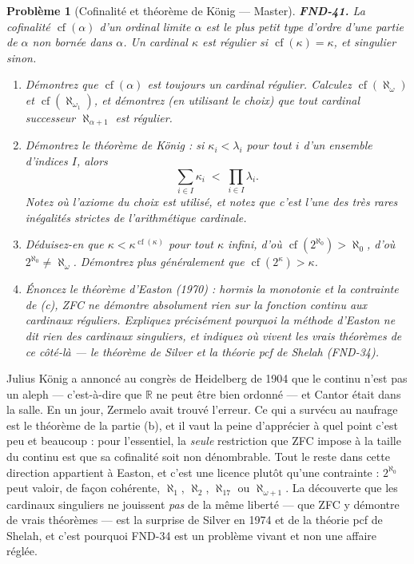 \documentclass[11pt]{article}
\newtheorem{problem}{Problème}
\begin{document}
\begin{problem}[{Cofinalité et théorème de König --- Master}]
\textbf{FND-41.} La \textit{cofinalité} $ \operatorname{cf}(\alpha) $ d'un ordinal limite
$ \alpha $ est le plus petit type d'ordre d'une partie de $ \alpha $ non bornée dans
$ \alpha $. Un cardinal $ \kappa $ est \textit{régulier} si
$ \operatorname{cf}(\kappa) = \kappa $, et \textit{singulier} sinon.
\begin{enumerate}
\item[(a)] Démontrez que $ \operatorname{cf}(\alpha) $ est toujours un cardinal régulier. Calculez
$ \operatorname{cf}(\aleph_\omega) $ et $ \operatorname{cf}(\aleph_{\omega_1}) $, et
démontrez (en utilisant le choix) que tout cardinal successeur $ \aleph_{\alpha+1} $ est
régulier.
\item[(b)] Démontrez le théorème de König : si $ \kappa_i < \lambda_i $ pour tout $ i $ d'un
ensemble d'indices $ I $, alors
\[ \sum_{i \in I} \kappa_i \;<\; \prod_{i \in I} \lambda_i . \]
Notez où l'axiome du choix est utilisé, et notez que c'est l'une des très rares inégalités
strictes de l'arithmétique cardinale.
\item[(c)] Déduisez-en que $ \kappa < \kappa^{\operatorname{cf}(\kappa)} $ pour tout $ \kappa $
infini, d'où $ \operatorname{cf}(2^{\aleph_0}) > \aleph_0 $, d'où
$ 2^{\aleph_0} \ne \aleph_\omega $. Démontrez plus généralement que
$ \operatorname{cf}(2^{\kappa}) > \kappa $.
\item[(d)] Énoncez le théorème d'Easton (1970) : hormis la monotonie et la contrainte de (c), ZFC ne
démontre absolument rien sur la fonction continu aux cardinaux \textit{réguliers}. Expliquez
précisément pourquoi la méthode d'Easton ne dit rien des cardinaux singuliers, et indiquez où
vivent les vrais théorèmes de ce côté-là --- le théorème de Silver et la théorie pcf de Shelah
(FND-34).
\end{enumerate}

\end{problem}

\noindent Julius König a annoncé au congrès de Heidelberg de 1904 que le continu n'est pas
un aleph --- c'est-à-dire que $\mathbb{R}$ ne peut être bien ordonné --- et Cantor était dans la salle. En un
jour, Zermelo avait trouvé l'erreur. Ce qui a survécu au naufrage est le théorème de la partie
(b), et il vaut la peine d'apprécier à quel point c'est peu et beaucoup : pour l'essentiel, la
\textit{seule} restriction que ZFC impose à la taille du continu est que sa cofinalité soit non
dénombrable. Tout le reste dans cette direction appartient à Easton, et c'est une licence plutôt
qu'une contrainte : $ 2^{\aleph_0} $ peut valoir, de façon cohérente, $ \aleph_1 $,
$ \aleph_2 $, $ \aleph_{17} $ ou $ \aleph_{\omega+1} $. La découverte que les cardinaux
singuliers ne jouissent \textit{pas} de la même liberté --- que ZFC y démontre de vrais théorèmes ---
est la surprise de Silver en 1974 et de la théorie pcf de Shelah, et c'est pourquoi FND-34 est un
problème vivant et non une affaire réglée.
\end{document}
